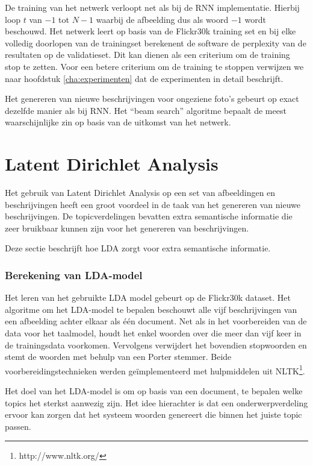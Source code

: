 De training van het netwerk verloopt net als bij de RNN implementatie. Hierbij loop $t$ van $-1$ tot $N-1$ waarbij de afbeelding dus als woord $-1$ wordt beschouwd. Het netwerk leert op basis van de Flickr30k training set en bij elke volledig doorlopen van de trainingset berekenent de software de perplexity van de resultaten op de validatieset. Dit kan dienen als een criterium om de training stop te zetten. Voor een betere criterium om de training te stoppen verwijzen we naar hoofdstuk \ref{cha:experimenten} dat de experimenten in detail beschrijft. %


Het genereren van nieuwe beschrijvingen voor ongeziene foto's gebeurt op exact dezelfde manier als bij RNN. Het ``beam search'' algoritme bepaalt de meest waarschijnlijke zin op basis van de uitkomst van het netwerk.


\section{Latent Dirichlet Analysis}
Het gebruik van Latent Dirichlet Analysis op een set van afbeeldingen en beschrijvingen heeft een groot voordeel in de taak van het genereren van nieuwe beschrijvingen. De topicverdelingen bevatten extra semantische informatie die zeer bruikbaar kunnen zijn voor het genereren van beschrijvingen.

 Deze sectie beschrijft hoe LDA zorgt voor extra semantische informatie.

\subsubsection{Berekening van LDA-model}
\label{subs:Berekening van topicverdeling}
Het leren van het gebruikte LDA model gebeurt op de Flickr30k dataset. Het algoritme om het LDA-model te bepalen beschouwt alle vijf beschrijvingen van een afbeelding achter elkaar als \'e\'en document. Net als in het voorbereiden van de data voor het taalmodel, houdt het enkel woorden over die meer dan vijf keer in de trainingsdata voorkomen. Vervolgens verwijdert het bovendien stopwoorden en stemt de woorden met behulp van een Porter stemmer. Beide voorbereidingstechnieken werden ge\"implementeerd met hulpmiddelen uit NLTK\footnote{http://www.nltk.org/}.

Het doel van het LDA-model is om op basis van een document, te bepalen welke topics het sterkst aanwezig zijn. Het idee hierachter is dat een onderwerpverdeling ervoor kan zorgen dat het systeem woorden genereert die binnen het juiste topic passen.

